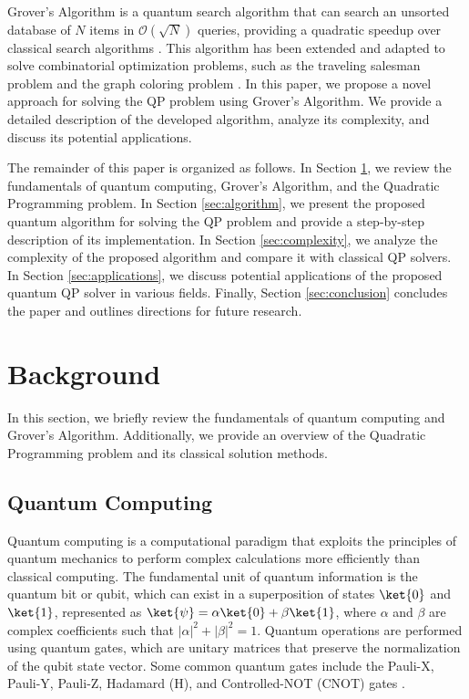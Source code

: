 Grover's Algorithm is a quantum search algorithm that can search an unsorted database of $N$ items in $\mathcal{O}(\sqrt{N})$ queries, providing a quadratic speedup over classical search algorithms \cite{grover1996fast}. This algorithm has been extended and adapted to solve combinatorial optimization problems, such as the traveling salesman problem and the graph coloring problem \cite{ambainis2000quantum}. In this paper, we propose a novel approach for solving the QP problem using Grover's Algorithm. We provide a detailed description of the developed algorithm, analyze its complexity, and discuss its potential applications.

The remainder of this paper is organized as follows. In Section \ref{sec:background}, we review the fundamentals of quantum computing, Grover's Algorithm, and the Quadratic Programming problem. In Section \ref{sec:algorithm}, we present the proposed quantum algorithm for solving the QP problem and provide a step-by-step description of its implementation. In Section \ref{sec:complexity}, we analyze the complexity of the proposed algorithm and compare it with classical QP solvers. In Section \ref{sec:applications}, we discuss potential applications of the proposed quantum QP solver in various fields. Finally, Section \ref{sec:conclusion} concludes the paper and outlines directions for future research.

\section{Background}
\label{sec:background}

In this section, we briefly review the fundamentals of quantum computing and Grover's Algorithm. Additionally, we provide an overview of the Quadratic Programming problem and its classical solution methods.

\subsection{Quantum Computing}

Quantum computing is a computational paradigm that exploits the principles of quantum mechanics to perform complex calculations more efficiently than classical computing. The fundamental unit of quantum information is the quantum bit or qubit, which can exist in a superposition of states $\ket{0}$ and $\ket{1}$, represented as $\ket{\psi} = \alpha\ket{0} + \beta\ket{1}$, where $\alpha$ and $\beta$ are complex coefficients such that $|\alpha|^2 + |\beta|^2 = 1$. Quantum operations are performed using quantum gates, which are unitary matrices that preserve the normalization of the qubit state vector. Some common quantum gates include the Pauli-X, Pauli-Y, Pauli-Z, Hadamard (H), and Controlled-NOT (CNOT) gates \cite{nielsen2010quantum}.

